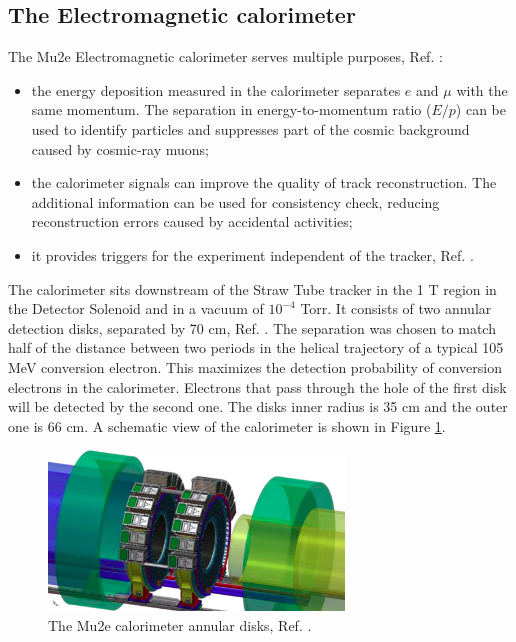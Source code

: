 \subsection{The Electromagnetic calorimeter}\label{calorimeter}
The Mu2e Electromagnetic calorimeter serves multiple purposes, Ref. \cite{em4}:
\begin{itemize}
    \item the energy deposition measured in the calorimeter separates $e$ and $\mu$ with the same momentum.
    The separation in energy-to-momentum ratio ($E/p$) can be used to identify particles and suppresses
    part of the cosmic background caused by cosmic-ray muons;
    \item the calorimeter signals can improve the quality of track reconstruction. The additional information can
    be used for consistency check, reducing reconstruction errors caused by accidental activities;
    \item it provides triggers for the experiment independent of the tracker, Ref. \cite{em6}. 
\end{itemize} 
The calorimeter sits downstream of the Straw Tube tracker in the 1 T region in the Detector Solenoid and in a vacuum of $10^{-4}$ Torr. 
It consists of two annular detection disks, separated by 70 cm, Ref. \cite{em7}. 
The separation was chosen to match half of the distance between two periods in the helical trajectory of a
typical 105 MeV conversion electron. This maximizes the detection probability of conversion electrons in the
calorimeter. Electrons that pass through the hole of the first disk will be detected by the second one.
The disks inner radius is 35 cm and the outer one is 66 cm. A schematic view of the calorimeter is shown in Figure \ref{fig:calo1}.
\begin{figure}[!h]
    \centering
    \includegraphics[width =0.7\textwidth]{figures/png/Screenshot_20240322_122050.png}
    \caption{The Mu2e calorimeter annular disks, Ref. \cite{em7}.}
    \label{fig:calo1}
\end{figure}
